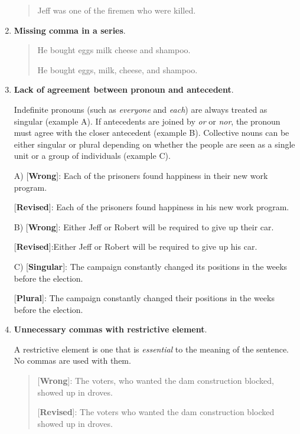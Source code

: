 \begin{enumerate}
\begin{quote}
Jeff was one of the firemen who were killed.      
\end{quote}

\item \textbf{Missing comma in a series}.
\begin{quote}
He bought eggs milk cheese and shampoo.      

He bought eggs, milk, cheese, and shampoo.      
\end{quote}

\item \textbf{Lack of agreement between pronoun and antecedent}.

Indefinite pronouns (such as \emph{everyone} and \emph{each}) are always treated as singular (example A). If antecedents are joined by \emph{or} or \emph{nor}, the pronoun must agree with the closer antecedent (example B). Collective nouns can be either singular or plural depending on whether the people are seen as a single unit or a group of individuals (example C).




A) [\textbf{Wrong}]: Each of the prisoners found happiness in their new work program. 

[\textbf{Revised}]: Each of the prisoners found happiness in his new work program. 


B) [\textbf{Wrong}]: Either Jeff or Robert will be required to give up their car. 

[\textbf{Revised}]:Either Jeff or Robert will be required to give up his car. 
\medskip

C) [\textbf{Singular}]: The campaign constantly changed its positions in the weeks before the election. 

[\textbf{Plural}]: The campaign constantly changed their positions in the weeks before the election. 


\item \textbf{Unnecessary commas with restrictive element}.

A restrictive element is one that is \emph{essential} to the meaning of the sentence. No commas are used with them. 

\begin{quote}
[\textbf{Wrong}]: The voters, who wanted the dam construction blocked, showed up in droves.

 [\textbf{Revised}]: The voters who wanted the dam construction blocked showed up in droves.
\end{quote}


\end{enumerate}
